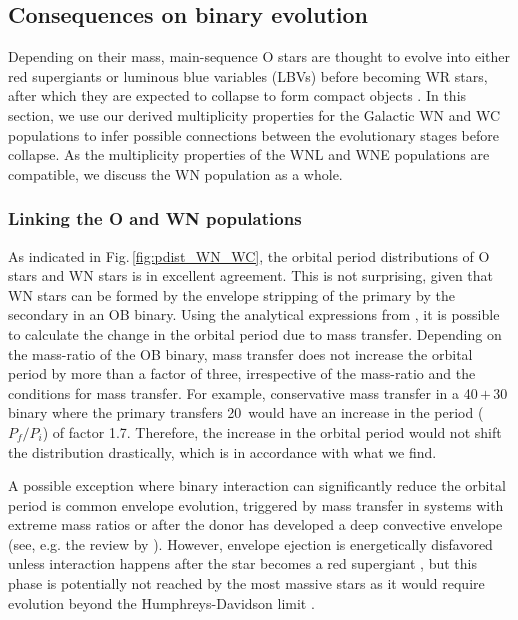 \subsection{Consequences on binary evolution}  \label{sect:orbitalprop}
Depending on their mass, main-sequence O stars are thought to evolve into either red supergiants or luminous blue variables (LBVs) before becoming WR stars, after which they are expected to collapse to form compact objects \citep{1976Conti,meynet_stellar_2003,crowther_physical_2007,langer_presupernova_2012}. In this section, we use our derived multiplicity properties for the Galactic WN and WC populations to infer possible connections between the evolutionary stages before collapse. As the multiplicity properties of the WNL and WNE populations are compatible, we discuss the WN population as a whole.


\subsubsection{Linking the O and WN populations}\label{sect:OWN}

As indicated in Fig.\,\ref{fig:pdist_WN_WC}, the orbital period distributions of O stars and WN stars is in excellent agreement. This is not surprising, given that WN stars can be formed by the envelope stripping of the primary by the secondary in an OB binary. Using the analytical expressions from \citet{soberman_stability_1997}, it is possible to calculate the change in the orbital period due to mass transfer. Depending on the mass-ratio of the OB binary, mass transfer does not increase the orbital period by more than a factor of three, irrespective of the mass-ratio and the conditions for mass transfer. For example, conservative mass transfer in a 40\,$+$\,30\,\Msun{} binary where the primary transfers 20\,\Msun{} would have an increase in the period ($P_f/P_i$) of factor 1.7. Therefore, the increase in the orbital period would not shift the distribution drastically, which is in accordance with what we find.

A possible exception where binary interaction can significantly reduce the orbital period is common envelope evolution, triggered by mass transfer in systems with extreme mass ratios or after the donor has developed a deep convective envelope (see, e.g. the review by \citealt{ivanova_common_2013}). However, envelope ejection is energetically disfavored unless interaction happens after the star becomes a red supergiant \citep[e.g.][]{klencki_it_2021}, but this phase is potentially not reached by the most massive stars as it would require evolution beyond the Humphreys-Davidson limit \citep{humphreys_studies_1979,davies_luminosities_2018,gilkis_excess_2021}.

